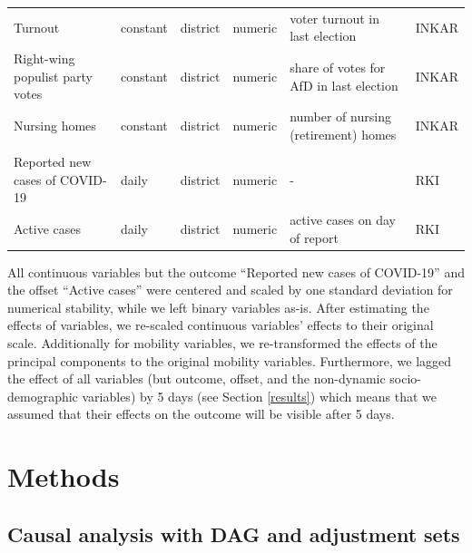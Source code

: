 \documentclass[]{elsarticle} %
\begin{document}
\begin{table}
\begin{tabular}[t]{llll>{\raggedright\arraybackslash}p{10em}l}
\hspace{1em}Turnout & constant & district & numeric & voter turnout in last election & INKAR \citep{inkar}\\
\hspace{1em}Right-wing populist party votes & constant & district & numeric & share of votes for AfD in last election & INKAR \citep{inkar}\\
\hspace{1em}Nursing homes & constant & district & numeric & number of nursing (retirement) homes & INKAR \citep{inkar}\\
\addlinespace[0.3em]
\multicolumn{6}{l}{\textbf{Case numbers}}\\
\hspace{1em}Reported new cases of COVID-19 & daily & district & numeric & - & RKI \citep{casenumbers_rki}\\
\hspace{1em}Active cases & daily & district & numeric & active cases on day of report & RKI \citep{casenumbers_rki}\\
\bottomrule
\end{tabular}
\end{table}

All continuous variables but the outcome ``Reported new cases of COVID-19'' and the offset ``Active cases'' were centered and scaled by one standard deviation for numerical stability, while we left binary variables as-is. After estimating the effects of variables, we re-scaled continuous variables' effects to their original scale. Additionally for mobility variables, we re-transformed the effects of the principal components to the original mobility variables. Furthermore, we lagged the effect of all variables (but outcome, offset, and the non-dynamic socio-demographic variables) by 5 days (see Section \ref{results}) which means that we assumed that their effects on the outcome will be visible after 5 days.

\hypertarget{methods}{%
\section{Methods}\label{methods}}

\hypertarget{causal-analysis-with-dag-and-adjustment-sets}{%
\subsection{Causal analysis with DAG and adjustment sets}\label{causal-analysis-with-dag-and-adjustment-sets}}
\end{document}
